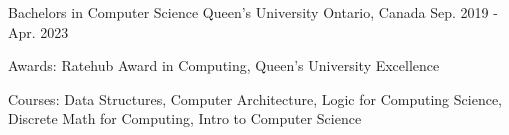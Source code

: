 

\begin{cventries}

  \cventry
    {Bachelors in Computer Science} %
    {Queen's University} %
    {Ontario, Canada} %
    {Sep. 2019 - Apr. 2023} %
    {
      \begin{cvitems} %
        \item {Awards: Ratehub Award in Computing, Queen’s University Excellence}
        \item {Courses: Data Structures, Computer Architecture, Logic for Computing Science, Discrete Math for Computing, Intro to Computer Science}
      \end{cvitems}
    }

\end{cventries}

